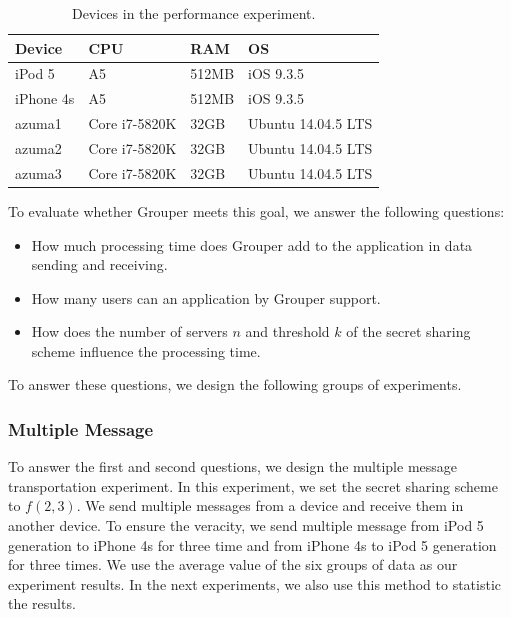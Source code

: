 \documentclass[twocolumn,10pt]{article}
\begin{document}
\begin{table}[t]
	\footnotesize
	\centering  
	\caption{Devices in the performance experiment.}
	\label{my-label}
	\begin{tabular}{llll}
		\hline
		\textbf{Device} & \textbf{CPU} & \textbf{RAM} & \textbf{OS} \\ \hline
		iPod 5 & A5 & 512MB & iOS 9.3.5 \\
		iPhone 4s & A5 & 512MB & iOS 9.3.5 \\
		azuma1 & Core i7-5820K & 32GB & Ubuntu 14.04.5 LTS \\
		azuma2 & Core i7-5820K & 32GB & Ubuntu 14.04.5 LTS \\
		azuma3 & Core i7-5820K & 32GB & Ubuntu 14.04.5 LTS \\ \hline
	\end{tabular}
\end{table}

To evaluate whether Grouper meets this goal, we answer the following questions:

\begin{itemize}
	\setlength{\itemsep}{1pt}
	\setlength{\parskip}{0pt}
	\setlength{\parsep}{0pt}
	\item How much processing time does Grouper add to the application in data sending and receiving.
	\item How many users can an application by Grouper support.
	\item How does the number of servers $n$ and threshold ${k}$ of the secret sharing scheme influence the processing time.
\end{itemize}

To answer these questions, we design the following groups of experiments.

\subsubsection{Multiple Message}

To answer the first and second questions, we design the multiple message transportation experiment.
In this experiment, we set the secret sharing scheme to ${f(2, 3)}$.
We send multiple messages from a device and receive them in another device. 
To ensure the veracity, we send multiple message from iPod 5 generation to iPhone 4s for three time and from iPhone 4s to iPod 5 generation for three times.
We use the average value of the six groups of data as our experiment results.
In the next experiments, we also use this method to statistic the results.
\end{document}
